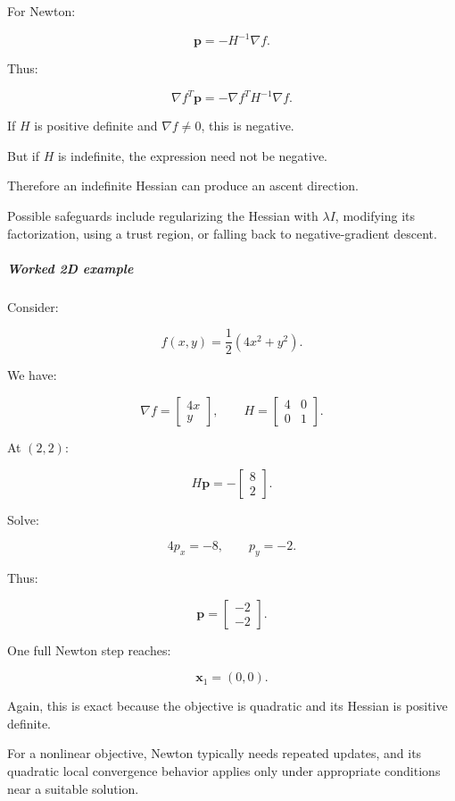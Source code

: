 For Newton:

\[
\mathbf p=-H^{-1}\nabla f.
\]

Thus:

\[
\nabla f^T\mathbf p = -\nabla f^TH^{-1}\nabla f.
\]

If \(H\) is positive definite and \(\nabla f\ne0\), this is negative.

But if \(H\) is indefinite, the expression need not be negative.

Therefore an indefinite Hessian can produce an ascent direction.

Possible safeguards include regularizing the Hessian with \(\lambda I\), modifying its factorization, using a trust region, or falling back to negative-gradient descent.

\subparagraph{Worked 2D example}\label{worked-2d-example}

Consider:

\[
f(x,y)=\frac12(4x^2+y^2).
\]

We have:

\[
\nabla f= \begin{bmatrix} 4x\\y \end{bmatrix}, \qquad H= \begin{bmatrix} 4&0\\0&1 \end{bmatrix}.
\]

At \((2,2)\):

\[
H\mathbf p= - \begin{bmatrix}8\\2\end{bmatrix}.
\]

Solve:

\[
4p_x=-8,\qquad p_y=-2.
\]

Thus:

\[
\mathbf p= \begin{bmatrix}-2\\-2\end{bmatrix}.
\]

One full Newton step reaches:

\[
\boxed{\mathbf x_1=(0,0)}.
\]

Again, this is exact because the objective is quadratic and its Hessian is positive definite.

For a nonlinear objective, Newton typically needs repeated updates, and its quadratic local convergence behavior applies only under appropriate conditions near a suitable solution.

